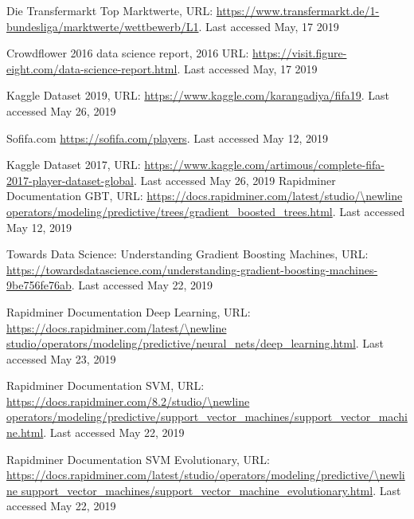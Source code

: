 \documentclass[runningheads]{llncs}
\begin{document}


%
\begin{thebibliography}{8}

Die Transfermarkt Top Marktwerte, URL: \url{https://www.transfermarkt.de/1-bundesliga/marktwerte/wettbewerb/L1}. Last accessed May, 17 2019

Crowdflower 2016 data science report, 2016   URL: \url{https://visit.figure-eight.com/data-science-report.html}. Last accessed May, 17 2019

Kaggle Dataset 2019, URL: \url{https://www.kaggle.com/karangadiya/fifa19}. Last accessed May 26, 2019

Sofifa.com \url{https://sofifa.com/players}. Last accessed May 12, 2019

Kaggle Dataset 2017, URL: \url{https://www.kaggle.com/artimous/complete-fifa-2017-player-dataset-global}. Last accessed May 26, 2019
Rapidminer Documentation GBT, URL: \url{https://docs.rapidminer.com/latest/studio/\newline operators/modeling/predictive/trees/gradient\_boosted\_trees.html}. Last accessed May 12, 2019


Towards Data Science: Understanding Gradient Boosting Machines, URL:  \url{https://towardsdatascience.com/understanding-gradient-boosting-machines-9be756fe76ab}. Last accessed May 22, 2019

Rapidminer Documentation Deep Learning, URL: \url{https://docs.rapidminer.com/latest/\newline studio/operators/modeling/predictive/neural\_nets/deep\_learning.html}. Last accessed May 23, 2019

Rapidminer Documentation SVM, URL: \url{https://docs.rapidminer.com/8.2/studio/\newline operators/modeling/predictive/support\_vector\_machines/support\_vector\_machine.html}. Last accessed May 22, 2019

Rapidminer Documentation SVM Evolutionary, URL: \url{https://docs.rapidminer.com/latest/studio/operators/modeling/predictive/\newline support\_vector\_machines/support\_vector\_machine\_evolutionary.html}. Last accessed May 22, 2019


\end{thebibliography}
\end{document}
